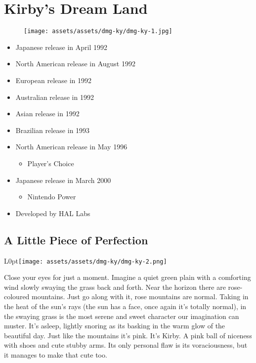 \documentclass{book}
\begin{document}
\chapter*{Kirby’s Dream Land}
\vspace{\baselineskip}\begin{figure}[H]{\texttt{[image: assets/assets/dmg-ky/dmg-ky-1.jpg]}}\end{figure}\vspace{\baselineskip}
\begin{itemize}[left=0pt, nosep]
\item Japanese release in April 1992
\item North American release in August 1992
\item European release in 1992
\item Australian release in 1992
\item Asian release in 1992
\item Brazilian release in 1993
\item North American release in May 1996
\begin{itemize}
\item Player’s Choice
\end{itemize}
\item Japanese release in March 2000
\begin{itemize}
\item Nintendo Power
\end{itemize}
\item Developed by HAL Labs

\end{itemize}
\newpage\FloatBarrier\section*{A Little Piece of Perfection}
\begin{wrapfigure}{L}{0pt}{\texttt{[image: assets/assets/dmg-ky/dmg-ky-2.png]}}\end{wrapfigure}\noindent
Close your eyes for just a moment. Imagine a quiet green plain with a comforting wind slowly swaying the grass back and forth. Near the horizon there are rose-coloured mountains. Just go along with it, rose mountains are normal. Taking in the heat of the sun’s rays (the sun has a face, once again it’s totally normal), in the swaying grass is the most serene and sweet character our imagination can muster. It’s asleep, lightly snoring as its basking in the warm glow of the beautiful day. Just like the mountains it’s pink. It’s Kirby. A pink ball of niceness with shoes and cute stubby arms. Its only personal flaw is its voraciousness, but it manages to make that cute too.\par
\end{document}
